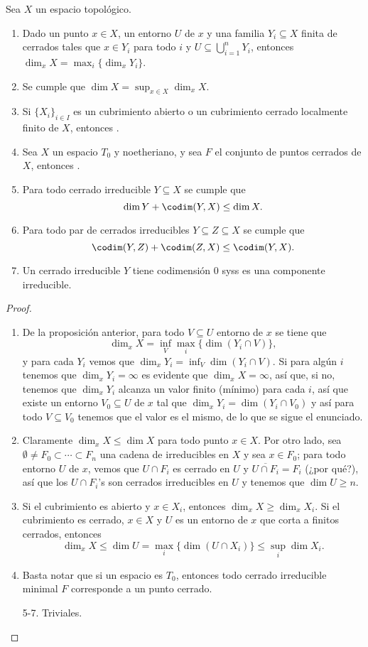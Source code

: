\begin{prop}
	Sea $X$ un espacio topológico.
	\begin{enumerate}
		\item Dado un punto $x \in X$, un entorno $U$ de $x$ y una familia $Y_i \subseteq X$ finita de cerrados tales que
			$x \in Y_i$ para todo $i$ y $U \subseteq \bigcup_{i=1}^n Y_i$, entonces $\dim_x X = \max_i\{ \dim_x Y_i \}$.
		\item Se cumple que $\dim X = \sup_{x\in X} \dim_x X$.
		\item Si $\{ X_i \}_{i\in I}$ es un cubrimiento abierto o un cubrimiento cerrado localmente finito de $X$,
			entonces .
		\item Sea $X$ un espacio $T_0$ y noetheriano, y sea $F$ el conjunto de puntos cerrados de $X$,
			entonces .
		\item Para todo cerrado irreducible $Y \subseteq X$ se cumple que
			$$ \dim Y + \codim(Y, X) \le \dim X. $$
		\item Para todo par de cerrados irreducibles $Y \subseteq Z \subseteq X$ se cumple que
			$$ \codim(Y, Z) + \codim(Z, X) \le \codim(Y, X). $$
		\item Un cerrado irreducible $Y$ tiene codimensión 0 syss es una componente irreducible.
	\end{enumerate}
\end{prop}
\begin{proof}
	\begin{enumerate}
		\item De la proposición anterior, para todo $V \subseteq U$ entorno de $x$ se tiene que
			$$ \dim_x X = \inf_V \max_i \{ \dim(Y_i \cap V) \}, $$
			y para cada $Y_i$ vemos que $\dim_x Y_i = \inf_V \dim(Y_i \cap V)$.
			Si para algún $i$ tenemos que $\dim_x Y_i = \infty$ es evidente que $\dim_x X = \infty$,
			así que, si no, tenemos que $\dim_x Y_i$ alcanza un valor finito (mínimo) para cada $i$, así que existe un entorno
			$V_0 \subseteq U$ de $x$ tal que $\dim_x Y_i = \dim(Y_i \cap V_0)$ y así para todo $V \subseteq V_0$ tenemos que
			el valor es el mismo, de lo que se sigue el enunciado.
		\item Claramente $\dim_x X \le \dim X$ para todo punto $x \in X$.
			Por otro lado, sea $\emptyset \ne F_0 \subset \cdots \subset F_n$ una cadena de irreducibles en $X$ y sea $x \in F_0$;
			para todo entorno $U$ de $x$, vemos que $U \cap F_i$ es cerrado en $U$ y $\overline{U \cap F_i} = F_i$ (¿por qué?),
			así que los $U \cap F_i$'s son cerrados irreducibles en $U$ y tenemos que $\dim U \ge n$.
		\item Si el cubrimiento es abierto y $x \in X_i$, entonces $\dim_x X \ge \dim_x X_i$.
			Si el cubrimiento es cerrado, $x \in X$ y $U$ es un entorno de $x$ que corta a finitos cerrados, entonces
			$$ \dim_x X \le \dim U = \max_i \{ \dim(U \cap X_i) \} \le \sup_i \dim X_i. $$
		\item Basta notar que si un espacio es $T_0$, entonces todo cerrado irreducible minimal $F$ corresponde a un punto cerrado.
		\item[5-7.] Triviales.
			\qedhere
	\end{enumerate}
\end{proof}
